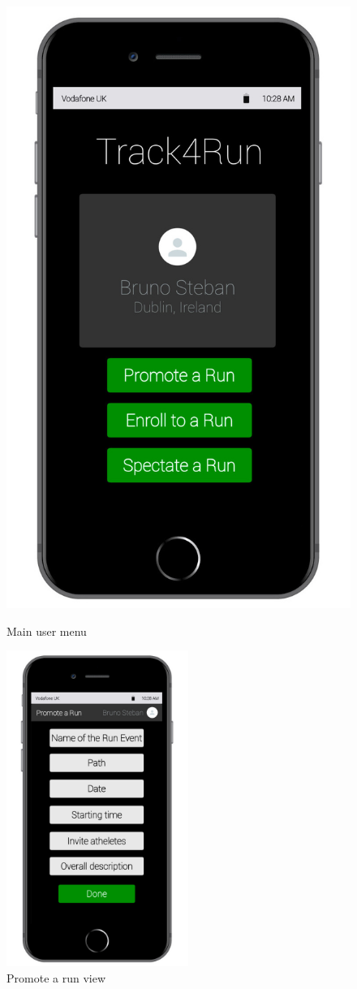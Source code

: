 \begin{enumerate}
\begin{figure}[H]
\end{figure}
\begin{figure}[H]
\begin{center}
        \begin{minipage}[c]{.40\textwidth}
        \centering
          \includegraphics[height=10.3 cm]{Images/Mockups/Track4RunMockup5.jpg}
	\caption{Main user menu}
        \end{minipage}%
        \hspace{10mm}%
        \begin{minipage}[c]{.40\textwidth}
        \centering
          \includegraphics[height=10.3cm]{Images/Mockups/Track4RunMockup6.jpg}
	\caption{Promote a run view}

\end{minipage}
\end{center}
\end{figure}
\end{enumerate}
